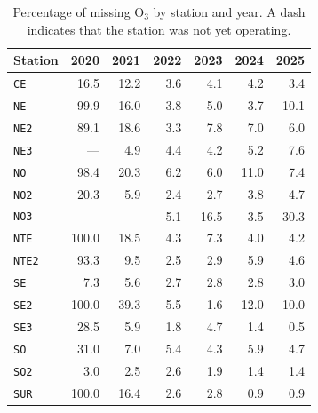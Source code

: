 \begin{table}[pos=t]
  \centering
  \caption{Percentage of missing O$_3$ by station and year. A dash indicates
    that the station was not yet operating.}
  \label{tab:dic-o3-faltante}
  \small
  \begin{tabular}{lrrrrrr}
    \toprule
    Station & 2020 & 2021 & 2022 & 2023 & 2024 & 2025 \\
    \midrule
    \texttt{CE}   & 16.5  & 12.2 & 3.6 & 4.1  & 4.2  & 3.4  \\
    \texttt{NE}   & 99.9  & 16.0 & 3.8 & 5.0  & 3.7  & 10.1 \\
    \texttt{NE2}  & 89.1  & 18.6 & 3.3 & 7.8  & 7.0  & 6.0  \\
    \texttt{NE3}  & ---   & 4.9  & 4.4 & 4.2  & 5.2  & 7.6  \\
    \texttt{NO}   & 98.4  & 20.3 & 6.2 & 6.0  & 11.0 & 7.4  \\
    \texttt{NO2}  & 20.3  & 5.9  & 2.4 & 2.7  & 3.8  & 4.7  \\
    \texttt{NO3}  & ---   & ---  & 5.1 & 16.5 & 3.5  & 30.3 \\
    \texttt{NTE}  & 100.0 & 18.5 & 4.3 & 7.3  & 4.0  & 4.2  \\
    \texttt{NTE2} & 93.3  & 9.5  & 2.5 & 2.9  & 5.9  & 4.6  \\
    \texttt{SE}   & 7.3   & 5.6  & 2.7 & 2.8  & 2.8  & 3.0  \\
    \texttt{SE2}  & 100.0 & 39.3 & 5.5 & 1.6  & 12.0 & 10.0 \\
    \texttt{SE3}  & 28.5  & 5.9  & 1.8 & 4.7  & 1.4  & 0.5  \\
    \texttt{SO}   & 31.0  & 7.0  & 5.4 & 4.3  & 5.9  & 4.7  \\
    \texttt{SO2}  & 3.0   & 2.5  & 2.6 & 1.9  & 1.4  & 1.4  \\
    \texttt{SUR}  & 100.0 & 16.4 & 2.6 & 2.8  & 0.9  & 0.9  \\
    \bottomrule
  \end{tabular}
\end{table}

